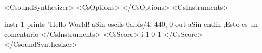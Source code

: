 <CsoundSynthesizer>
<CsOptions>
</CsOptions>
<CsInstruments>

instr 1
	prints "Hello World!%
	aSin      oscils    0dbfs/4, 440, 0
    out       aSin
endin
;Esto es un comentario
</CsInstruments>
<CsScore> 
i 1 0 1
</CsScore>
</CsoundSynthesizer> 